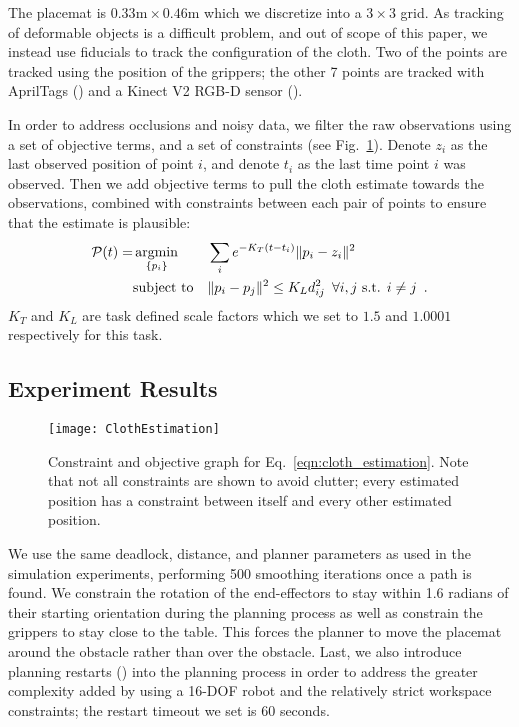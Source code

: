 The placemat is $0.33\text{m} \times 0.46\text{m}$ which we discretize into a $3 \times 3$ grid. As tracking of deformable objects is a difficult problem, and out of scope of this paper, we instead use fiducials to track the configuration of the cloth. Two of the points are tracked using the position of the grippers; the other 7 points are tracked with AprilTags (\cite{olson2011tags}) and a Kinect V2 RGB-D sensor (\cite{iai_kinect2}).

In order to address occlusions and noisy data, we filter the raw observations using a set of objective terms, and a set of constraints (see Fig.~\ref{fig:cloth_estimation}). Denote $z_i$ as the last observed position of point $i$, and denote $t_i$ as the last time point $i$ was observed. Then we add objective terms to pull the cloth estimate towards the observations, combined with constraints between each pair of points to ensure that the estimate is plausible:
\begin{equation}
\begin{aligned}
    \mathcal{P}(t) = &\operatorname*{argmin}_{\{ p_i \}} 
            & & \sum_i e^{-K_T(t - t_i)} \| p_i - z_i \|^2 \\
            & \text{subject to}
            & & \| p_i - p_j \|^2 \leq K_L d_{ij}^2 \enspace \forall i, j \text{ s.t. } i \neq j \enspace .
\end{aligned}
\label{eqn:cloth_estimation}
\end{equation}
$K_T$ and $K_L$ are task defined scale factors which we set to $1.5$ and $1.0001$ respectively for this task.

\subsection{Experiment Results}


\begin{figure}[ht]
    \centering
    \texttt{[image: ClothEstimation]}
    \caption{Constraint and objective graph for Eq.~\eqref{eqn:cloth_estimation}. Note that not all constraints are shown to avoid clutter; every estimated position has a constraint between itself and every other estimated position.}
    \label{fig:cloth_estimation}
\end{figure}







We use the same deadlock, distance, and planner parameters as used in the simulation experiments, performing 500 smoothing iterations once a path is found. We constrain the rotation of the end-effectors to stay within 1.6 radians of their starting orientation during the planning process as well as constrain the grippers to stay close to the table. This forces the planner to move the placemat around the obstacle rather than over the obstacle. Last, we also introduce planning restarts (\cite{Wedge2008}) into the planning process in order to address the greater complexity added by using a 16-DOF robot and the relatively strict workspace constraints; the restart timeout we set is 60 seconds.



